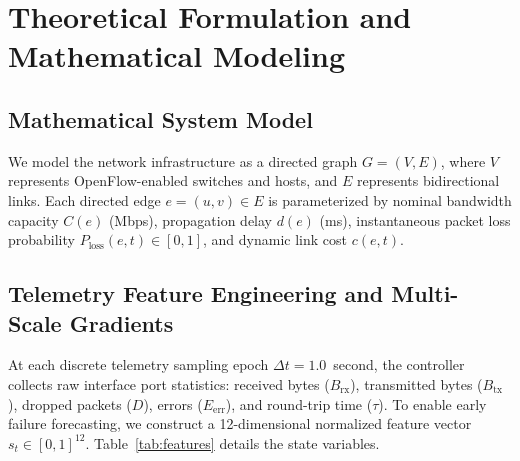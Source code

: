 \documentclass[11pt,a4paper]{report}
\begin{document}
\chapter{Theoretical Formulation and Mathematical Modeling}

\section{Mathematical System Model}
We model the network infrastructure as a directed graph $G = (V, E)$, where $V$ represents OpenFlow-enabled switches and hosts, and $E$ represents bidirectional links. Each directed edge $e = (u, v) \in E$ is parameterized by nominal bandwidth capacity $C(e)$ (Mbps), propagation delay $d(e)$ (ms), instantaneous packet loss probability $P_{\text{loss}}(e, t) \in [0, 1]$, and dynamic link cost $c(e, t)$.

\section{Telemetry Feature Engineering and Multi-Scale Gradients}
At each discrete telemetry sampling epoch $\Delta t = 1.0$~second, the controller collects raw interface port statistics: received bytes ($B_{\text{rx}}$), transmitted bytes ($B_{\text{tx}}$), dropped packets ($D$), errors ($E_{\text{err}}$), and round-trip time ($\tau$). To enable early failure forecasting, we construct a 12-dimensional normalized feature vector $s_t \in [0, 1]^{12}$. Table~\ref{tab:features} details the state variables.
\end{document}
